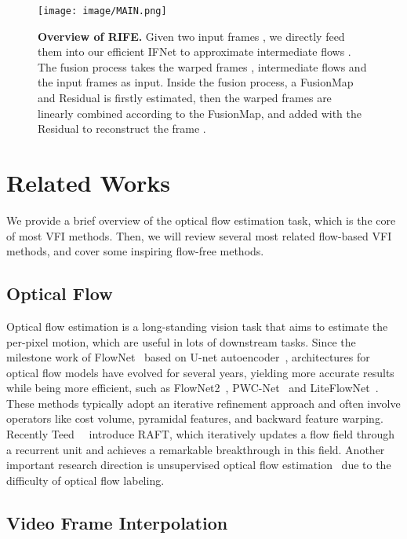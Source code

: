 \documentclass[10pt,twocolumn,letterpaper]{article}
\begin{document}
\begin{figure*}
	\centering
	\texttt{[image: image/MAIN.png]}
	\caption{\textbf{Overview of RIFE.} Given two input frames , we directly feed them into our efficient IFNet to approximate intermediate flows . The fusion process takes the warped frames , intermediate flows  and the input frames  as input. Inside the fusion process, a FusionMap and Residual is firstly estimated, then the warped frames are linearly combined according to the FusionMap, and added with the Residual to reconstruct the frame . }\label{fig:main}\vspace{-1em}
\end{figure*} 	\section{Related Works}
We provide a brief overview of the optical flow estimation task, which is the core of most VFI methods. Then, we will review several most related flow-based VFI methods, and cover some inspiring flow-free methods. 
\subsection{Optical Flow}
Optical flow estimation is a long-standing vision task that aims to estimate the per-pixel motion, which are useful in lots of downstream tasks. Since the milestone work of FlowNet~\cite{dosovitskiy2015flownet} based on U-net autoencoder~\cite{ronneberger2015u}, architectures for optical flow models have evolved for several years, yielding more accurate results while being more efficient, such as FlowNet2~\cite{ilg2017flownet}, PWC-Net~\cite{sun2018pwc} and LiteFlowNet~\cite{hui2018liteflownet}. These methods typically adopt an iterative refinement approach and often involve operators like cost volume, pyramidal features, and backward feature warping. Recently Teed~\etal~\cite{teed2020raft} introduce RAFT, which iteratively updates a flow field through a recurrent unit and achieves a remarkable breakthrough in this field. Another important research direction is unsupervised optical flow estimation~\cite{meister2017unflow, jonschkowski2020matters, luo2020upflow} due to the difficulty of optical flow labeling.







\subsection{Video Frame Interpolation}
\end{document}
